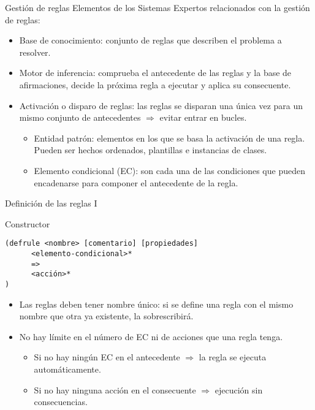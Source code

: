 \documentclass[usenames,dvipsnames,aspectratio=169]{beamer}
\begin{document}
\begin{frame}{Gestión de reglas}
	Elementos de los Sistemas Expertos relacionados con la gestión de reglas:
	\begin{itemize}
		\item Base de conocimiento: conjunto de reglas que describen el problema a resolver.
		\item Motor de inferencia: comprueba el antecedente de las reglas y la base de afirmaciones, decide la próxima regla a ejecutar y aplica su consecuente.
		\item Activación o disparo de reglas: las reglas se disparan una única vez para un mismo conjunto de antecedentes $\Rightarrow$ evitar entrar en bucles.
		\begin{itemize}
			\item Entidad patrón: elementos en los que se basa la activación de una regla. Pueden ser hechos ordenados, plantillas e instancias de clases.
			\item Elemento condicional (EC): son cada una de las condiciones que pueden encadenarse para componer el antecedente de la regla. 
		\end{itemize}
	\end{itemize}
\end{frame}

\begin{frame}[fragile]{Definición de las reglas I}
	\begin{block}{Constructor}
		\begin{verbatim}
(defrule <nombre> [comentario] [propiedades]
      <elemento-condicional>*
      =>
      <acción>*
)
		\end{verbatim}
	\end{block}
	\begin{itemize}
		\item Las reglas deben tener nombre único: si se define una regla con el mismo nombre que otra ya existente, la sobrescribirá.
		\item No hay límite en el número de EC ni de acciones que una regla tenga.
		\begin{itemize}
			\item Si no hay ningún EC en el antecedente $\Rightarrow$ la regla se ejecuta automáticamente.
			\item Si no hay ninguna acción en el consecuente $\Rightarrow$ ejecución sin consecuencias.
		\end{itemize}
	\end{itemize}
\end{frame}
\end{document}
